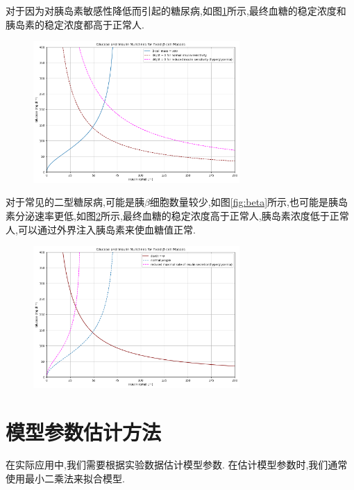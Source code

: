 对于因为对胰岛素敏感性降低而引起的糖尿病,如图\ref{fig:hyperglycemia}所示,最终血糖的稳定浓度和胰岛素的稳定浓度都高于正常人. 
\begin{figure}[H]
    \centering
    \includegraphics[width=0.7\textwidth]{Img/hyperglycemia.png}
    \label{fig:hyperglycemia}
\end{figure}

对于常见的二型糖尿病,可能是胰$\beta$细胞数量较少,如图\ref{fig:beta}所示,也可能是胰岛素分泌速率更低,如图\ref{fig:lessinsulin}所示,最终血糖的稳定浓度高于正常人,胰岛素浓度低于正常人,可以通过外界注入胰岛素来使血糖值正常. 
\begin{figure}[H]
    \centering
    \includegraphics[width=0.7\textwidth]{Img/lessinsulin.png}
    \label{fig:lessinsulin}
\end{figure}
\section{模型参数估计方法}
在实际应用中,我们需要根据实验数据估计模型参数. 在估计模型参数时,我们通常使用最小二乘法来拟合模型. 

